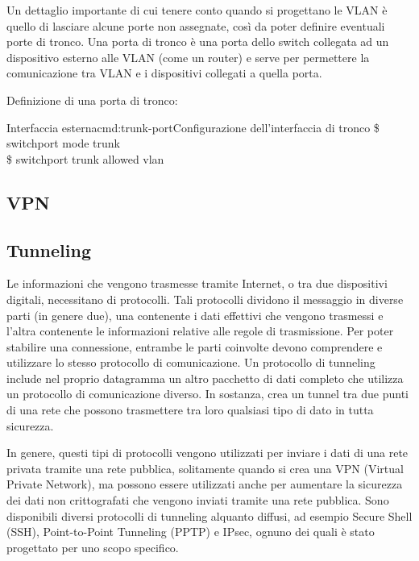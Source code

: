Un dettaglio importante di cui tenere conto quando si progettano le VLAN è quello di lasciare alcune porte non assegnate, così da poter definire eventuali porte di tronco. Una porta di tronco è una porta dello switch collegata ad un dispositivo esterno alle VLAN (come un router) e serve per permettere la comunicazione tra VLAN e i dispositivi collegati a quella porta.

Definizione di una porta di tronco:

\begin{cmds}[Switch]{Interfaccia esterna}{cmd:trunk-port}{Configurazione dell'interfaccia di tronco}
    \$ switchport mode trunk\\
    \$ switchport trunk allowed vlan
\end{cmds}

\subsection{VPN}
\subsection{Tunneling}
Le informazioni che vengono trasmesse tramite Internet, o tra due dispositivi digitali, necessitano di protocolli. Tali protocolli dividono il messaggio in diverse parti (in genere due), una contenente i dati effettivi che vengono trasmessi e l'altra contenente le informazioni relative alle regole di trasmissione. Per poter stabilire una connessione, entrambe le parti coinvolte devono comprendere e utilizzare lo stesso protocollo di comunicazione. Un protocollo di tunneling include nel proprio datagramma un altro pacchetto di dati completo che utilizza un protocollo di comunicazione diverso. In sostanza, crea un tunnel tra due punti di una rete che possono trasmettere tra loro qualsiasi tipo di dato in tutta sicurezza.

In genere, questi tipi di protocolli vengono utilizzati per inviare i dati di una rete privata tramite una rete pubblica, solitamente quando si crea una VPN (Virtual Private Network), ma possono essere utilizzati anche per aumentare la sicurezza dei dati non crittografati che vengono inviati tramite una rete pubblica. Sono disponibili diversi protocolli di tunneling alquanto diffusi, ad esempio Secure Shell (SSH), Point-to-Point Tunneling (PPTP) e IPsec, ognuno dei quali è stato progettato per uno scopo specifico.

